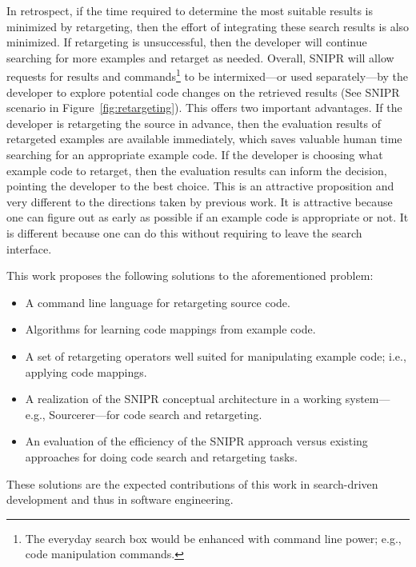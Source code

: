In retrospect, if the time required to determine the most suitable results is minimized by retargeting, then the effort of integrating these search results is also minimized. If retargeting is unsuccessful, then the developer will continue searching for more examples and retarget as needed. Overall, \uppercase{SnipR} will allow requests for results and commands\footnote{The everyday search box would be enhanced with command line power; e.g., code manipulation commands.} to be intermixed---or used separately---by the developer to explore potential code changes on the retrieved results (See \uppercase{SnipR} scenario in Figure~\ref{fig:retargeting}). This offers two important advantages. If the developer is retargeting the source in advance, then the evaluation results of retargeted examples are available immediately, which saves valuable human time searching for an appropriate example code. If the developer is choosing what example code to retarget, then the evaluation results can inform the decision, pointing the developer to the best choice. This is an attractive proposition and very different to the directions taken by previous work. It is attractive because one can figure out as early as possible if an example code is appropriate or not. It is different because one can do this without requiring to leave the search interface.

This work proposes the following solutions to the aforementioned problem:

\begin{itemize}
\item A command line language for retargeting source code. 
\item Algorithms for learning code mappings from example code. 
\item A set of retargeting operators well suited for manipulating example code; i.e., applying code mappings.
\item A realization of the \uppercase{SnipR} conceptual architecture in a working system---e.g., Sourcerer\cite{Bajracharya:2006vn}---for code search and retargeting. 
\item An evaluation of the efficiency of the \uppercase{SnipR} approach versus existing approaches for doing code search and retargeting tasks. 
\end{itemize}

These solutions are the expected contributions of this work in search-driven development and thus in software engineering. 


